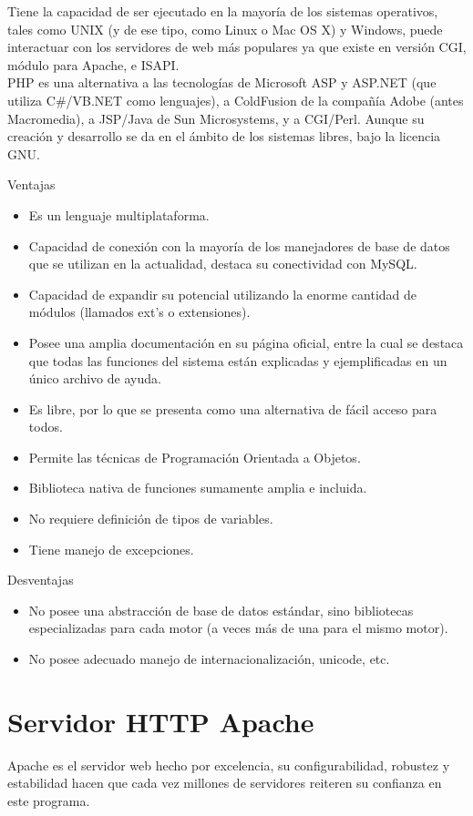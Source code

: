 Tiene la capacidad de ser ejecutado en la mayor\'ia de los sistemas operativos, tales como UNIX (y de ese tipo, como Linux o Mac OS X) y Windows, puede interactuar con los servidores de web m\'as populares ya que existe en versi\'on CGI, m\'odulo para Apache, e ISAPI.\\

PHP es una alternativa a las tecnolog\'ias de Microsoft ASP y ASP.NET (que utiliza C\#/VB.NET como lenguajes), a ColdFusion de la compa\~n\'ia Adobe (antes Macromedia), a JSP/Java de Sun Microsystems, y a CGI/Perl. Aunque su creaci\'on y desarrollo se da en el \'ambito de los sistemas libres, bajo la licencia GNU. \cite{php}

Ventajas
\begin{itemize}
\item Es un lenguaje multiplataforma.
\item Capacidad de conexi\'on con la mayor\'ia de los manejadores de base de datos que se utilizan en la actualidad, destaca su conectividad con MySQL.
\item Capacidad de expandir su potencial utilizando la enorme cantidad de m\'odulos (llamados ext's o extensiones).
\item Posee una amplia documentaci\'on en su p\'agina oficial, entre la cual se destaca que todas las funciones del sistema est\'an explicadas y ejemplificadas en un \'unico archivo de ayuda.
\item Es libre, por lo que se presenta como una alternativa de f\'acil acceso para todos.
\item Permite las t\'ecnicas de Programaci\'on Orientada a Objetos.
\item Biblioteca nativa de funciones sumamente amplia e incluida.
\item No requiere definici\'on de tipos de variables.
\item Tiene manejo de excepciones.
\end{itemize}
Desventajas
\begin{itemize}
\item No posee una abstracci\'on de base de datos est\'andar, sino bibliotecas especializadas para cada motor (a veces m\'as de una para el mismo motor).
\item No posee adecuado manejo de internacionalizaci\'on, unicode, etc.
\end{itemize}

\section{Servidor HTTP Apache}
Apache es el servidor web hecho por excelencia, su configurabilidad, robustez y estabilidad hacen que cada vez millones de servidores reiteren su confianza en este programa.\\

